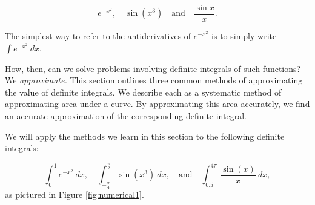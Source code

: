 $$
e^{-x^2}, \quad \sin(x^3)\quad \text{and} \quad \frac{\sin x}{x}.
$$

The simplest way to refer to the antiderivatives of $e^{-x^2}$ is to simply write $\int e^{-x^2}\ dx$. 

How, then, can we solve problems involving definite integrals of such functions? We \textit{approximate.} 
This section outlines three common methods of approximating the value of definite integrals. We describe each as a systematic method of approximating area under a curve. By approximating this area accurately, we find an accurate approximation of the corresponding definite integral.

We will apply the methods we learn in this section to the following definite integrals:

$$
\int_0^1 e^{-x^2} \ dx, \quad \int_{-\frac{\pi}{4}}^{\frac{\pi}{2}} \sin(x^3) \ dx, \quad \text{and} \quad \int_{0.5}^{4\pi} \frac{\sin(x)}{x} \ dx,
$$
as pictured in Figure \ref{fig:numerical1}.


